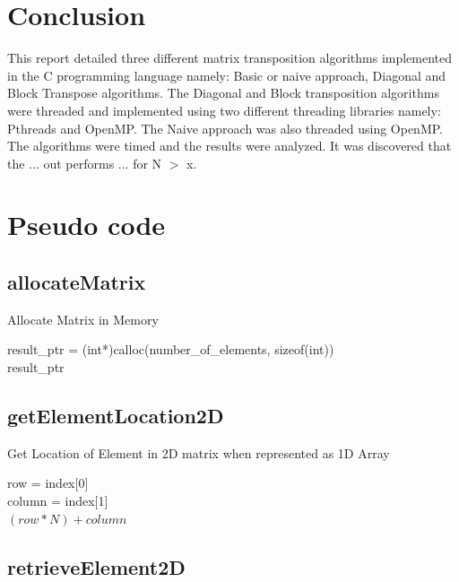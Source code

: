 \documentclass[10pt, onecolumn]{article}
\begin{document}
\section{Conclusion}
%
This report detailed three different matrix transposition algorithms implemented in the C programming language namely: Basic or naive approach, Diagonal and Block Transpose algorithms. The Diagonal and Block transposition algorithms were threaded and implemented using two different threading libraries namely: Pthreads and OpenMP. The Naive approach was also threaded using OpenMP. The algorithms were timed and the results were analyzed. It was discovered that the ... out performs ... for N $>$ x. 
%
\clearpage
\appendix

\section{Pseudo code}
\label{App:Apendix}
\subsection{allocateMatrix}
    \begin{algorithm}[H]
        \label{Alg:allocateMatrix}
        \caption{Allocate Matrix in Memory}
        result\_ptr = (int*)calloc(number\_of\_elements, sizeof(int)) \\
        \Return result\_ptr
    \end{algorithm}
%
\subsection{getElementLocation2D}

    \begin{algorithm}[H]
        \label{Alg:getElementLocation2D}
        \caption{Get Location of Element in 2D matrix when represented as 1D Array}
        row = index[0]\\
        column = index[1]\\
        \Return $(row*N)+column$
    \end{algorithm}
\subsection{retrieveElement2D}
\end{document}
